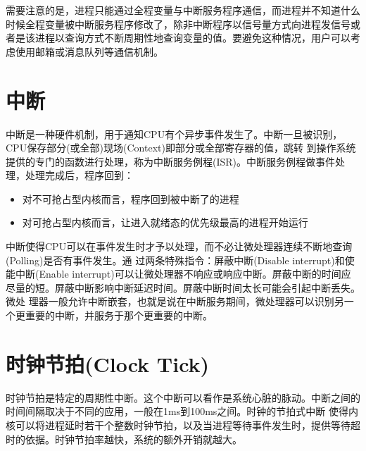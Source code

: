 \documentclass[a4paper,12pt]{report}
\begin{document}
\begin{appendix}
\begin{spacing}{1.5}
    需要注意的是，进程只能通过全程变量与中断服务程序通信，而进程并不知道什么时候全程变量被中断服务程序修改了，除非中断程序以信号量方式向进程发信号或者是该进程以查询方式不断周期性地查询变量的值。要避免这种情况，用户可以考虑使用邮箱或消息队列等通信机制。
\end{spacing}


\section{    中断}
\begin{spacing}{1.5}
中断是一种硬件机制，用于通知CPU有个异步事件发生了。中断一旦被识别，CPU保存部分(或全部)现场(Context)即部分或全部寄存器的值，跳转 到操作系统提供的专门的函数进行处理，称为中断服务例程(ISR)。中断服务例程做事件处理，处理完成后，程序回到：
\begin{itemize}
  \item 			对不可抢占型内核而言，程序回到被中断了的进程
  \item 			对可抢占型内核而言，让进入就绪态的优先级最高的进程开始运行
\end{itemize}

中断使得CPU可以在事件发生时才予以处理，而不必让微处理器连续不断地查询(Polling)是否有事件发生。通 过两条特殊指令：屏蔽中断(Disable interrupt)和使能中断(Enable interrupt)可以让微处理器不响应或响应中断。屏蔽中断的时间应尽量的短。屏蔽中断影响中断延迟时间。屏蔽中断时间太长可能会引起中断丢失。微处 理器一般允许中断嵌套，也就是说在中断服务期间，微处理器可以识别另一个更重要的中断，并服务于那个更重要的中断。

\end{spacing}

\section{    时钟节拍(Clock Tick)}
\begin{spacing}{1.5}
    时钟节拍是特定的周期性中断。这个中断可以看作是系统心脏的脉动。中断之间的时间间隔取决于不同的应用，一般在1ms到100ms之间。时钟的节拍式中断 使得内核可以将进程延时若干个整数时钟节拍，以及当进程等待事件发生时，提供等待超时的依据。时钟节拍率越快，系统的额外开销就越大。

\end{spacing}


\end{appendix}
\end{document}
